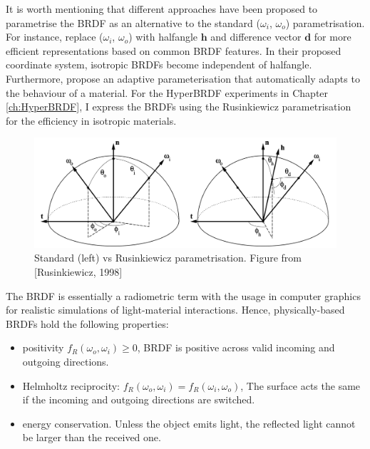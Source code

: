 It is worth mentioning that different approaches have been proposed to parametrise the BRDF as an alternative to the standard ($\omega_i$, $\omega_o$) parametrisation.  For instance, \citeauthor{rusinkiewicz1998new} \cite{rusinkiewicz1998new} replace ($\omega_i$, $\omega_o$)  with halfangle $\bm{h}$ and difference vector $\bm{d}$ for more efficient representations based on common BRDF features. In their proposed coordinate system, isotropic BRDFs become independent of halfangle. Furthermore, \citeauthor{dupuy2018adaptive} \cite{dupuy2018adaptive} propose an adaptive parameterisation that automatically adapts to the behaviour of a material. For the HyperBRDF experiments in Chapter \ref{ch:HyperBRDF}, I express the BRDFs using the Rusinkiewicz parametrisation \cite{rusinkiewicz1998new} for the efficiency in isotropic materials.


\begin{figure}[ht]
  \centering
   \includegraphics[width=\linewidth]{Images/Rusinkiewicz.png}
   \caption{Standard (left) vs Rusinkiewicz parametrisation. Figure from [Rusinkiewicz, 1998]}
   \label{fig:RusinkiewiczvsStandard}
\end{figure}


The BRDF is essentially a radiometric term with the usage in computer graphics for realistic simulations of light-material interactions. Hence, physically-based BRDFs hold the following properties:
\begin{itemize}
  \item positivity $f_R(\omega_o, \omega_i) \geq 0$, BRDF is positive across valid incoming and outgoing directions.
  \item Helmholtz reciprocity: $f_R(\omega_o, \omega_i) = f_R(\omega_i, \omega_o)$, The surface acts the same if the incoming and outgoing directions are switched.
  \item energy conservation. Unless the object emits light, the reflected light cannot be larger than the received one.
\end{itemize}


